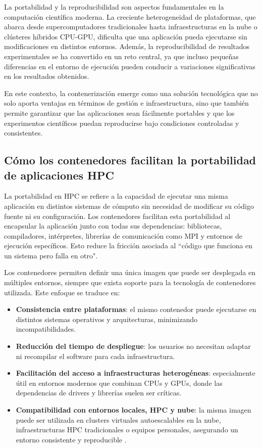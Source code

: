 La portabilidad y la reproducibilidad son aspectos fundamentales en la computación científica moderna. La creciente heterogeneidad de plataformas, que abarca desde supercomputadores tradicionales hasta infraestructuras en la nube o clústeres híbridos CPU-GPU, dificulta que una aplicación pueda ejecutarse sin modificaciones en distintos entornos. Además, la reproducibilidad de resultados experimentales se ha convertido en un reto central, ya que incluso pequeñas diferencias en el entorno de ejecución pueden conducir a variaciones significativas en los resultados obtenidos.

En este contexto, la contenerización emerge como una solución tecnológica que no solo aporta ventajas en términos de gestión e infraestructura, sino que también permite garantizar que las aplicaciones sean fácilmente portables y que los experimentos científicos puedan reproducirse bajo condiciones controladas y consistentes.

\subsection{Cómo los contenedores facilitan la portabilidad de aplicaciones HPC}

La portabilidad en \acs{HPC} se refiere a la capacidad de ejecutar una misma aplicación en distintos sistemas de cómputo sin necesidad de modificar su código fuente ni su configuración. Los contenedores facilitan esta portabilidad al encapsular la aplicación junto con todas sus dependencias: bibliotecas, compiladores, intérpretes, librerías de comunicación como MPI y entornos de ejecución específicos. Esto reduce la fricción asociada al ``código que funciona en un sistema pero falla en otro".

Los contenedores permiten definir una única imagen que puede ser desplegada en múltiples entornos, siempre que exista soporte para la tecnología de contenedores utilizada. Este enfoque se traduce en:

\begin{itemize}
    \item \textbf{Consistencia entre plataformas}: el mismo contenedor puede ejecutarse en distintos sistemas operativos y arquitecturas, minimizando incompatibilidades.
    \item \textbf{Reducción del tiempo de despliegue}: los usuarios no necesitan adaptar ni recompilar el software para cada infraestructura.
    \item \textbf{Facilitación del acceso a infraestructuras heterogéneas}: especialmente útil en entornos modernos que combinan CPUs y GPUs, donde las dependencias de drivers y librerías suelen ser críticas.
    \item \textbf{Compatibilidad con entornos locales, HPC y nube}: la misma imagen puede ser utilizada en clusters virtuales autoescalables en la nube, infraestructuras HPC tradicionales o equipos personales, asegurando un entorno consistente y reproducible \cite{Vaillancourt2020SelfScalingCA}.
\end{itemize}

